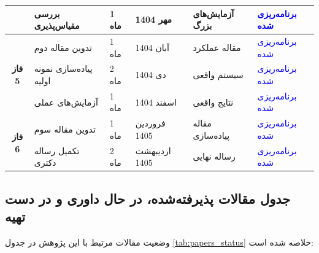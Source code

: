 \documentclass[11pt]{article}
\begin{document}
\begin{table}[h]
{\begin{tabular}{|c|p{4cm}|p{3cm}|p{2cm}|p{3cm}|p{2cm}|}
& بررسی مقیاس‌پذیری & 1 ماه & مهر 1404 & آزمایش‌های بزرگ & \textcolor{blue}{برنامه‌ریزی شده} \\
\hline
\multirow{3}{*}{\textbf{فاز 5}} & تدوین مقاله دوم & 1 ماه & آبان 1404 & مقاله عملکرد & \textcolor{blue}{برنامه‌ریزی شده} \\
\cline{2-6}
& پیاده‌سازی نمونه اولیه & 2 ماه & دی 1404 & سیستم واقعی & \textcolor{blue}{برنامه‌ریزی شده} \\
\cline{2-6}
& آزمایش‌های عملی & 1 ماه & اسفند 1404 & نتایج واقعی & \textcolor{blue}{برنامه‌ریزی شده} \\
\hline
\multirow{2}{*}{\textbf{فاز 6}} & تدوین مقاله سوم & 1 ماه & فروردین 1405 & مقاله پیاده‌سازی & \textcolor{blue}{برنامه‌ریزی شده} \\
\cline{2-6}
& تکمیل رساله دکتری & 2 ماه & اردیبهشت 1405 & رساله نهایی & \textcolor{blue}{برنامه‌ریزی شده} \\
\hline
\end{tabular}
}
\end{table}

\subsection{جدول مقالات پذیرفته‌شده، در حال داوری و در دست تهیه}

وضعیت مقالات مرتبط با این پژوهش در جدول \ref{tab:papers_status} خلاصه شده است:
\end{document}
